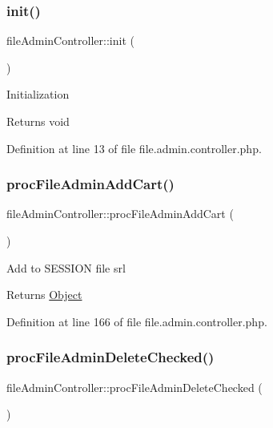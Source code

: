 \subsubsection{\texorpdfstring{init()}{init()}}
{\footnotesize\ttfamily file\+Admin\+Controller\+::init (\begin{DoxyParamCaption}{ }\end{DoxyParamCaption})}

Initialization \begin{DoxyReturn}{Returns}
void 
\end{DoxyReturn}


Definition at line 13 of file file.\+admin.\+controller.\+php.

\hypertarget{classfileAdminController_a9ba55f911e0f616159687149b0b37fc3}{}\label{classfileAdminController_a9ba55f911e0f616159687149b0b37fc3} 
\subsubsection{\texorpdfstring{proc\+File\+Admin\+Add\+Cart()}{procFileAdminAddCart()}}
{\footnotesize\ttfamily file\+Admin\+Controller\+::proc\+File\+Admin\+Add\+Cart (\begin{DoxyParamCaption}{ }\end{DoxyParamCaption})}

Add to S\+E\+S\+S\+I\+ON file srl

\begin{DoxyReturn}{Returns}
\hyperlink{classObject}{Object} 
\end{DoxyReturn}


Definition at line 166 of file file.\+admin.\+controller.\+php.

\hypertarget{classfileAdminController_a0f3042e741a71e3223ea0c9af2d224a4}{}\label{classfileAdminController_a0f3042e741a71e3223ea0c9af2d224a4} 
\subsubsection{\texorpdfstring{proc\+File\+Admin\+Delete\+Checked()}{procFileAdminDeleteChecked()}}
{\footnotesize\ttfamily file\+Admin\+Controller\+::proc\+File\+Admin\+Delete\+Checked (\begin{DoxyParamCaption}{ }\end{DoxyParamCaption})}

